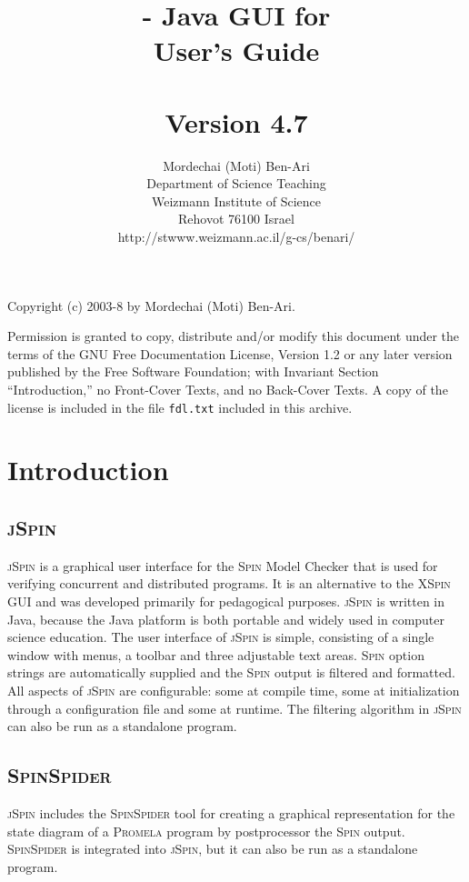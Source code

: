 \documentclass[11pt]{article}
\title{\js{} - Java GUI for \spn{}\\User's Guide\\\mbox{}\\\large{Version 4.7}}
\author{Mordechai (Moti) Ben-Ari\\
Department of Science Teaching\\
Weizmann Institute of Science\\
Rehovot 76100 Israel\\
\textsf{http://stwww.weizmann.ac.il/g-cs/benari/}}
\newcommand{\spn}{\textsc{Spin}}
\newcommand{\prm}{\textsc{Promela}}
\newcommand{\js}{\textsc{jSpin}}
\newcommand{\spd}{\textsc{SpinSpider}}
\newcommand{\p}[1]{\texttt{#1}}
\begin{document}
\maketitle
\thispagestyle{empty}

\vfill

\begin{center}
Copyright (c) 2003-8 by Mordechai (Moti) Ben-Ari.
\end{center}
Permission is granted to copy, distribute and/or modify this document
under the terms of the GNU Free Documentation License, Version 1.2
or any later version published by the Free Software Foundation;
with Invariant Section ``Introduction,'' no Front-Cover Texts, and no
Back-Cover Texts. A copy of the license is included in the file
\p{fdl.txt} included in this archive.
\newpage

\section{Introduction}

\subsection{\js{}}
\js{} is a graphical user interface for the \spn{} Model Checker that is
used for verifying concurrent and distributed programs. It is an
alternative to the \textsc{XSpin} GUI and was developed primarily for
pedagogical purposes. \js{} is written in Java, because the Java
platform is both portable and widely used in computer science education.
The user interface of \js{} is simple, consisting of a single window
with menus, a toolbar and three adjustable text areas. \spn{} option
strings are automatically supplied and the \spn{} output is filtered and
formatted. All aspects of \js{} are configurable: some at compile time,
some at initialization through a configuration file and some at runtime.
The filtering algorithm in \js{} can also be run as a standalone
program.

\subsection{\spd{}}
\js{} includes the \spd{} tool for creating a graphical representation for
the state diagram of a \prm{} program by postprocessor the \spn{} output. 
\spd{} is integrated into \js{}, but it can also be run as a standalone program.
\end{document}
